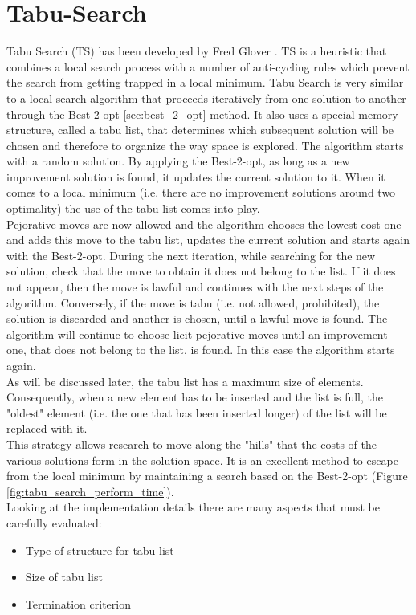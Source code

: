 \section{Tabu-Search}
Tabu Search (TS) has been developed by Fred Glover \cite{Glover1998}. TS is a heuristic that combines a local search process with a number of anti-cycling rules which prevent the search from getting trapped in a local minimum. Tabu Search is very similar to a local search algorithm that proceeds iteratively from one solution to another through the Best-2-opt \ref{sec:best_2_opt} method. It also uses a special memory structure, called a tabu list, that determines which subsequent solution will be chosen and therefore to organize the way space is explored. The algorithm starts with a random solution. By applying the Best-2-opt, as long as a new improvement solution is found, it updates the current solution to it. When it comes to a local minimum (i.e. there are no improvement solutions around two optimality) the use of the tabu list comes into play.\\
Pejorative moves are now allowed and the algorithm chooses the lowest cost one and adds this move to the tabu list, updates the current solution and starts again with the Best-2-opt.
During the next iteration, while searching for the new solution, check that the move to obtain it does not belong to the list. If it does not appear, then the move is lawful and continues with the next steps of the algorithm. Conversely, if the move is tabu (i.e. not allowed, prohibited), the solution is discarded and another is chosen, until a lawful move is found. The algorithm will continue to choose licit pejorative moves until an improvement one, that does not belong to the list, is found. In this case the algorithm starts again.\\
As will be discussed later, the tabu list has a maximum size of elements. Consequently, when a new element has to be inserted and the list is full, the "oldest" element (i.e. the one that has been inserted longer) of the list will be replaced with it.\\
This strategy allows research to move along the "hills" that the costs of the various solutions form in the solution space. It is an excellent method to escape from the local minimum by maintaining a search based on the Best-2-opt (Figure \ref{fig:tabu_search_perform_time}).\\
Looking at the implementation details there are many aspects that must be carefully evaluated:

\begin{itemize}
\item Type of structure for tabu list
\item Size of tabu list
\item Termination criterion
\end{itemize}

